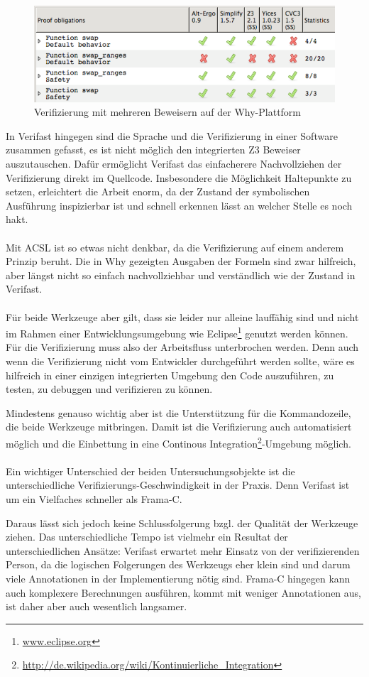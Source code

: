 \begin{figure}[H]
	\centering
\includegraphics[width=1.0\textwidth]{images/why-multiple-provers.png}
\caption{Verifizierung mit mehreren Beweisern auf der Why-Plattform}
\end{figure}

In Verifast hingegen sind die Sprache und die Verifizierung in einer Software zusammen gefasst,
es ist nicht möglich den integrierten Z3 Beweiser auszutauschen. Dafür ermöglicht Verifast das
einfacherere Nachvollziehen der Verifizierung direkt im Quellcode. Insbesondere die Möglichkeit
Haltepunkte zu setzen, erleichtert die Arbeit enorm, da der Zustand der symbolischen Ausführung
inspizierbar ist und schnell erkennen lässt an welcher Stelle es noch hakt.
\\
\\
Mit ACSL ist so etwas nicht denkbar, da die Verifizierung auf einem anderem Prinzip beruht. Die
in Why gezeigten Ausgaben der Formeln sind zwar hilfreich, aber längst nicht so einfach nachvollziehbar und
verständlich wie der Zustand in Verifast.
\\
\\
Für beide Werkzeuge aber gilt, dass sie leider nur alleine lauffähig sind und nicht im Rahmen
einer Entwicklungsumgebung wie Eclipse\footnote{\url{www.eclipse.org}} genutzt werden können. 
Für die Verifizierung muss also der Arbeitsfluss unterbrochen werden. Denn auch wenn die Verifizierung
nicht vom Entwickler durchgeführt werden sollte, wäre es hilfreich in einer einzigen integrierten Umgebung
den Code auszuführen, zu testen, zu debuggen und verifizieren zu können.

Mindestens genauso wichtig aber ist die Unterstützung für die Kommandozeile, die beide Werkzeuge
mitbringen. Damit ist die Verifizierung auch automatisiert möglich und die Einbettung in eine
Continous Integration\footnote{\url{http://de.wikipedia.org/wiki/Kontinuierliche_Integration}}-Umgebung möglich.
\\
\\
Ein wichtiger Unterschied der beiden Untersuchungsobjekte ist die unterschiedliche Verifizierungs-Geschwindigkeit
in der Praxis. Denn Verifast ist um ein Vielfaches schneller als Frama-C. 

Daraus lässt sich jedoch keine Schlussfolgerung bzgl. der Qualität der Werkzeuge ziehen. Das unterschiedliche Tempo ist 
vielmehr ein Resultat der unterschiedlichen Ansätze: Verifast erwartet mehr Einsatz von der verifizierenden Person, da
die logischen Folgerungen des Werkzeugs eher klein sind und darum viele Annotationen in der Implementierung nötig sind.
Frama-C hingegen kann auch komplexere Berechnungen ausführen, kommt mit weniger Annotationen aus, ist daher aber auch
wesentlich langsamer.




